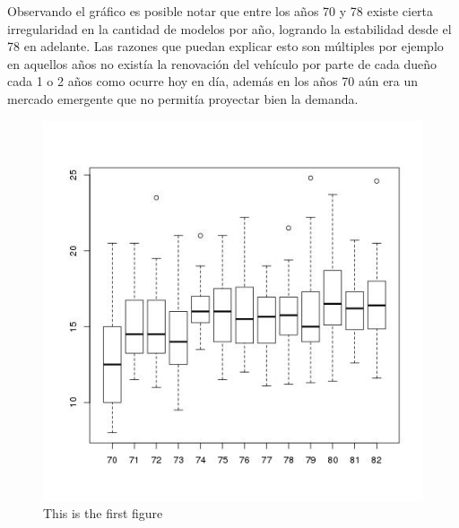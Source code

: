 \documentclass[letter,10pt]{article}
\begin{document}
Observando el gráfico es posible notar que entre los años 70 y 78 existe cierta irregularidad en la cantidad de modelos por
año, logrando la estabilidad desde el 78 en adelante. Las razones que puedan explicar esto son múltiples por ejemplo en aquellos años
no existía la renovación del vehículo por parte de cada dueño cada 1 o 2 años como ocurre hoy en día, además en los años 70 aún
era un mercado emergente que no permitía proyectar bien la demanda.

  \begin{minipage}{\linewidth}
      \centering
      \begin{minipage}{0.45\linewidth}
          \begin{figure}[H]
              \includegraphics[width=\linewidth]{bp_acceleration_year.jpg}
              \caption{This is the first figure}
          \end{figure}
      \end{minipage}
      \hspace{0.05\linewidth}
      \begin{minipage}{0.45\linewidth}
          \begin{figure}[H]

\end{figure}
\end{minipage}
\end{minipage}
\end{document}
